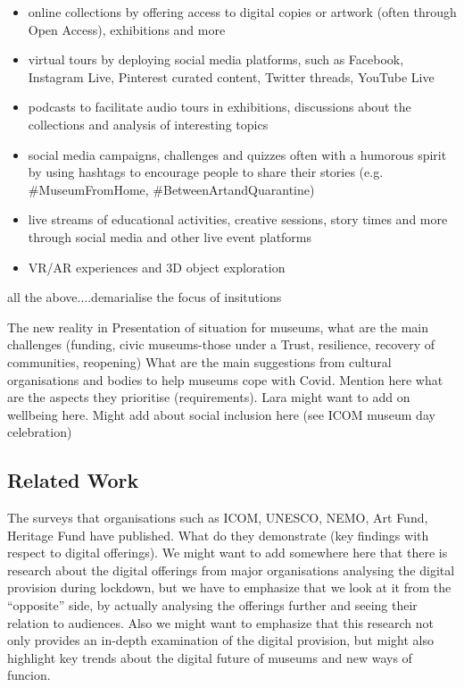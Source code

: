 \documentclass{egpubl}
\begin{document}
\begin{itemize}
\item online collections by offering access to digital copies or artwork (often through Open Access), exhibitions and more
  
\item virtual tours by deploying social media platforms, such as Facebook, Instagram Live, Pinterest curated content, Twitter threads, YouTube Live

\item podcasts to facilitate audio tours in exhibitions, discussions about the collections and analysis of interesting topics

\item social media campaigns, challenges and quizzes often with a humorous spirit by using hashtags to encourage people to share their stories (e.g. \#MuseumFromHome, \#BetweenArtandQuarantine)

\item live streams of educational activities, creative sessions, story times and more through social media and other live event platforms

\item VR/AR experiences and 3D object exploration

\end{itemize}







all the above....demarialise the focus of insitutions 




The new reality  in 
Presentation of situation for museums, what are the main challenges (funding, civic museums-those under a Trust, resilience, recovery of communities, reopening)
What are the main suggestions from cultural organisations and bodies to help museums cope with Covid. Mention here what are the aspects they prioritise (requirements).
Lara might want to add on wellbeing here.
Might add about social inclusion here (see ICOM museum day celebration)


\subsection{Related Work}
The surveys that organisations such as ICOM, UNESCO, NEMO, Art Fund, Heritage Fund have published. What do they demonstrate (key findings with respect to digital offerings).
We might want to add somewhere here that there is research about the digital offerings from major organisations analysing the digital provision during lockdown, but we have to emphasize that we look at it from the “opposite” side, by actually analysing the offerings further and seeing their relation to audiences. Also we might want to emphasize that this research not only provides an in-depth examination of the digital provision, but might also highlight key trends about the digital future of museums and new ways of funcion.
\end{document}
